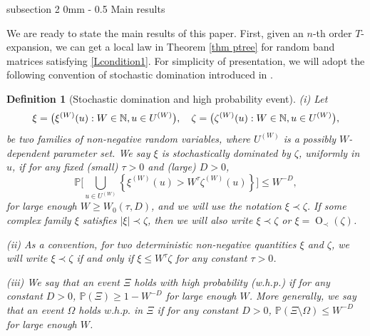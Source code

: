 \documentclass{article}
\makeatletter
\newcommand{\1}{\mathds{1}}
\numberwithin{equation}{section}
\renewcommand{\leq}{\leqslant}
\renewcommand{\geq}{\geqslant}
\renewcommand{\le}{\leq}
\renewcommand{\ge}{\geq}
\renewcommand{\P}{\mathbb{P}}
\newcommand{\selfs}{\text{self-energies}}
\DeclareMathOperator{\OO}{O}
\theoremstyle{plain} %
\newtheorem{definition}[theorem]{Definition}
\theoremstyle{remark}
\newcommand{\Sele}{{\mathcal E}}
\renewcommand{\subsection}{\@startsection
	{subsection}%
	{2}%
	{0mm}%
	{-\baselineskip}%
	{0.5\baselineskip}%
	{\normalfont\bf\itshape}} %
\makeatother
\begin{document}



\subsection{Main results}\label{subsec_main}

We are ready to state the main results of this paper. First, given an $n$-th order $T$-expansion, we can get a local law in Theorem \ref{thm ptree} for random band matrices satisfying \eqref{Lcondition1}. For simplicity of presentation, we will adopt the following convention of stochastic domination introduced in \cite{EKY_Average}. %

\begin{definition}[Stochastic domination and high probability event]\label{stoch_domination}
	(i) Let
	\[\xi=\big(\xi^{(W)}(u):W\in\mathbb N, u\in U^{(W)}\big),\hskip 10pt \zeta=\big(\zeta^{(W)}(u):W\in\mathbb N, u\in U^{(W)}\big),\]
	be two families of non-negative random variables, where $U^{(W)}$ is a possibly $W$-dependent parameter set. We say $\xi$ is stochastically dominated by $\zeta$, uniformly in $u$, if for any fixed (small) $\tau>0$ and (large) $D>0$, 
	\[\mathbb P\bigg[\bigcup_{u\in U^{(W)}}\left\{\xi^{(W)}(u)>W^\tau\zeta^{(W)}(u)\right\}\bigg]\le W^{-D},\]
	for large enough $W\ge W_0(\tau, D)$, and we will use the notation $\xi\prec\zeta$.	If some complex family $\xi$ satisfies $|\xi|\prec\zeta$, then we will also write $\xi \prec \zeta$ or $\xi=\OO_\prec(\zeta)$. 
	
	\vspace{5pt}
	\noindent (ii) As a convention, for two deterministic non-negative quantities $\xi$ and $\zeta$, we will write $\xi\prec\zeta$ if and only if $\xi\le W^\tau \zeta$ for any constant $\tau>0$. 
	
	\vspace{5pt}
	\noindent (iii) We say that an event $\Xi$ holds with high probability (w.h.p.) if for any constant $D>0$, $\mathbb P(\Xi)\ge 1- W^{-D}$ for large enough $W$. More generally, we say that an event $\Omega$ holds $w.h.p.$ in $\Xi$ if for any constant $D>0$,
	$\P( \Xi\setminus \Omega)\le W^{-D}$ for large enough $W$.
\end{definition}
\end{document}
